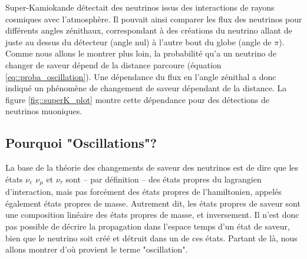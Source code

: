             Super-Kamiokande détectait des neutrinos issus des interactions de rayons cosmiques avec l'atmosphère. Il pouvait ainsi comparer les flux des neutrinos pour différents angles zénithaux, correspondant à des créations du neutrino allant de juste au dessus du détecteur (angle nul) à l'autre bout du globe (angle de $\pi$). Comme nous allons le montrer plus loin, la probabilité qu'a un neutrino de changer de saveur dépend de la distance parcoure (équation \eqref{eq::proba_oscillation}). Une dépendance du flux en l'angle zénithal a donc indiqué un phénomène de changement de saveur dépendant de la distance. La figure \autoref{fig::superK_plot} montre cette dépendance pour des détections de neutrinos muoniques.
    
        \subsection{Pourquoi "Oscillations"?}\label{sec::oscillations}
            La base de la théorie des changements de saveur des neutrinos est de dire que les états $\nu_e$ $\nu_{\mu}$ et $\nu_{\tau}$ sont -- par définition -- des états propres du lagrangien d'interaction, mais pas forcément des états propres de l'hamiltonien, appelés également états propres de masse. Autrement dit, les états propres de saveur sont une composition linéaire des états propres de masse, et inversement. Il n'est donc pas possible de décrire la propagation dans l'espace temps d'un état de saveur, bien que le neutrino soit créé et détruit dans un de ces états. Partant de là, nous allons montrer d'où provient le terme "oscillation".
            
